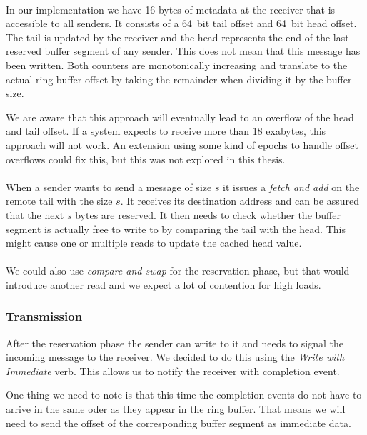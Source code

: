\paragraph{} In our implementation we have 16 bytes of metadata at the receiver that is accessible to all senders. It consists
of a 64~bit tail offset and 64~bit head offset. The tail is updated by the receiver and the head represents the end of the
last reserved buffer segment of any sender. This does not mean that this message has been written. Both counters are
monotonically increasing and translate to the actual ring buffer offset by taking the remainder when dividing it by
the buffer size.

We are aware that this approach will eventually lead to an overflow of the head and tail offset. If a system expects to receive
more than 18 exabytes, this approach will not work. An extension using some kind of epochs to handle offset overflows could
fix this, but this was not explored in this thesis.

\paragraph{}When a sender wants to send a message of size $s$ it issues a \emph{fetch and add} on the remote tail with the 
size $s$. It receives its destination address and can be assured that the next $s$ bytes are reserved. It then needs
to check whether the buffer segment is actually free to write to by comparing the tail with the head. This might cause one 
or multiple reads to update the cached head value.

\paragraph{} We could also use \emph{compare and swap} for the reservation phase, but that would introduce another read and
we expect a lot of contention for high loads.

\subsubsection{Transmission}
After the reservation phase the sender can write to it and needs to signal the incoming message to the receiver. We decided 
to do this using the \emph{Write with Immediate} verb. This allows us to notify the receiver with completion event. 

One thing we need to note is that this time the completion events do not have to arrive in the same oder as they appear in
the ring buffer. That means we will need to send the offset of the corresponding buffer segment as immediate data.


